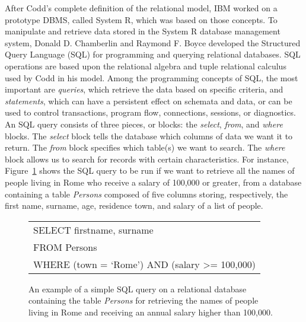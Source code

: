 After Codd's complete definition of the relational model, IBM worked on a prototype DBMS, called System R, which was based on those concepts. To manipulate and retrieve data stored in the System R database management system, Donald D. Chamberlin and Raymond F. Boyce developed the Structured Query Language (SQL) for programming and querying relational databases. SQL operations are based upon the relational algebra and tuple relational calculus used by Codd in his model. Among the programming concepts of SQL, the most important are \textit{queries}, which retrieve the data based on specific criteria, and \textit{statements}, which can have a persistent effect on schemata and data, or can be used to control transactions, program flow, connections, sessions, or diagnostics. An SQL query consists of three pieces, or blocks: the \textit{select}, \textit{from}, and \textit{where} blocks. The \textit{select} block tells the database which columns of data we want it to return. The \textit{from} block specifies which table(s) we want to search. The \textit{where} block allows us to search for records with certain characteristics. For instance, Figure~\ref{fig:3.1} shows the SQL query to be run if we want to retrieve all the names of people living in Rome who receive a salary of {\texteuro}100,000 or greater, from a database containing a table \textit{Persons} composed of five columns storing, respectively, the first name, surname, age, residence town, and salary of a list of people.

\begin{figure}[!b]
\begin{tabular}{l}
SELECT firstname, surname\\
FROM Persons\\
WHERE (town = `Rome') AND (salary >= 100,000)\\
\end{tabular}
\caption{\label{fig:3.1}An example of a simple SQL query on a relational database containing the table \textit{Persons }for retrieving the names of people living in Rome and receiving an annual salary higher than {\texteuro}100,000.}
\end{figure}

